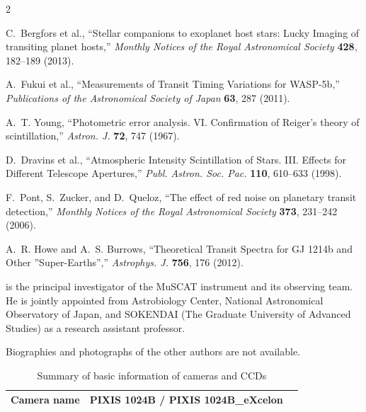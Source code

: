 \documentclass[a4paper,12pt]{spieman}  %
\begin{document}
\begin{spacing}{2}
\begin{thebibliography}{}
C.~{Bergfors} et al., ``{Stellar companions to exoplanet host stars: Lucky Imaging
  of transiting planet hosts},'' {\em Monthly Notices of the Royal Astronomical Society} {\bf 428}, 182--189  (2013).

A.~{Fukui} et al., ``{Measurements of Transit Timing Variations for WASP-5b},''
{\em Publications of the Astronomical Society of Japan} {\bf 63}, 287  (2011).

A.~T. {Young}, ``{Photometric error analysis. VI. Confirmation of Reiger's
  theory of scintillation},'' {\em Astron. J.} {\bf 72}, 747  (1967).

D.~{Dravins} et al., ``{Atmospheric
  Intensity Scintillation of Stars. III. Effects for Different Telescope
  Apertures},'' {\em Publ. Astron. Soc. Pac.} {\bf 110}, 610--633  (1998).

F.~{Pont}, S.~{Zucker}, and D.~{Queloz}, ``{The effect of red noise on
  planetary transit detection},'' {\em Monthly Notices of the Royal Astronomical Society} {\bf 373}, 231--242  (2006).

A.~R. {Howe} and A.~S. {Burrows}, ``{Theoretical Transit Spectra for GJ 1214b
  and Other ''Super-Earths''},'' {\em Astrophys. J.} {\bf 756}, 176  (2012).

\end{thebibliography}


\vspace{2ex} is the principal investigator of the MuSCAT instrument and its observing team.
He is jointly appointed from Astrobiology Center, National Astronomical Observatory of Japan,
and SOKENDAI (The Graduate University of Advanced Studies) as a research assistant professor.


\vspace{1ex}
\noindent Biographies and photographs of the other authors are not available.

\begin{table}
\caption{
\label{CCDsummary}
Summary of basic information of cameras and CCDs
}
\begin{center}
\begin{tabular}{clll}
\hline \hline
\multicolumn{2}{c}{Camera name}  & PIXIS 1024B / PIXIS 1024B\_eXcelon \\
\hline


\end{tabular}
\end{center}
\end{table}
\end{spacing}
\end{document}
